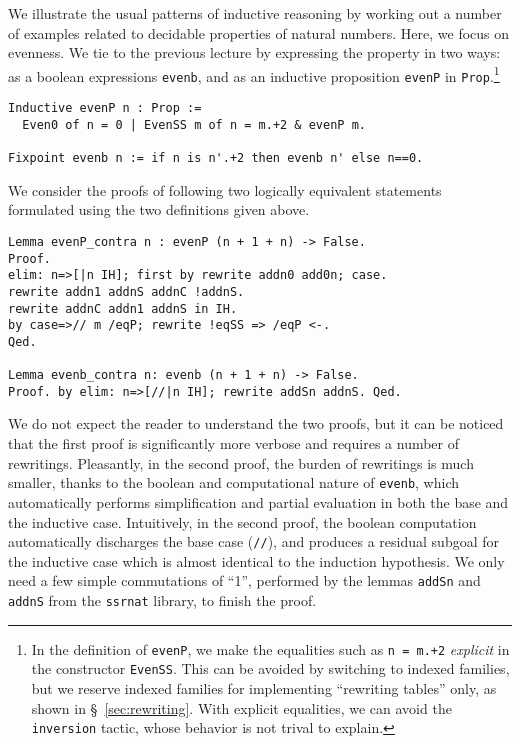 \documentclass[blockstyle,preprint,nocopyrightspace]{sigplanconf}
\newcommand{\is}[1]{\textcolor{blue}{(Ilya: {#1})}}
\newcommand{\an}[1]{\textcolor{red}{(Aleks: {#1})}}
\newcommand{\code}[1]{\lstinline{#1}}
\begin{document}
We illustrate the usual patterns of inductive reasoning by working out
a number of examples related to decidable properties of natural
numbers. Here, we focus on evenness. We tie to the previous lecture by
expressing the property in two ways: as a boolean expressions
\code{evenb}, and as an inductive proposition \code{evenP} in
\code{Prop}.\footnote{In the definition of \code{evenP}, we make the
  equalities such as \code{n = m.+2} \emph{explicit} in the
  constructor \code{EvenSS}. This can be avoided by switching to
  indexed families, but we reserve indexed families for implementing
  ``rewriting tables'' only, as shown in \S~\ref{sec:rewriting}.
%
  With explicit equalities, we can avoid the \code{inversion} tactic,
  whose behavior is not trival to explain.}
%
\begin{lstlisting}
Inductive evenP n : Prop :=
  Even0 of n = 0 | EvenSS m of n = m.+2 & evenP m.

Fixpoint evenb n := if n is n'.+2 then evenb n' else n==0.
\end{lstlisting}
%
We consider the proofs of following two logically equivalent
statements formulated using the two definitions given above.
%
%
%
\begin{lstlisting}
Lemma evenP_contra n : evenP (n + 1 + n) -> False.
Proof.
elim: n=>[|n IH]; first by rewrite addn0 add0n; case.
rewrite addn1 addnS addnC !addnS. 
rewrite addnC addn1 addnS in IH.
by case=>// m /eqP; rewrite !eqSS => /eqP <-.
Qed.

Lemma evenb_contra n: evenb (n + 1 + n) -> False.
Proof. by elim: n=>[//|n IH]; rewrite addSn addnS. Qed.
\end{lstlisting}
%
We do not expect the reader to understand the two proofs, but it can
be noticed that the first proof is significantly more verbose and
requires a number of rewritings. Pleasantly, in the second proof, the
burden of rewritings is much smaller, thanks to the boolean and
computational nature of \code{evenb}, which automatically performs
simplification and partial evaluation in both the base and the
inductive case. Intuitively, in the second proof, the boolean
computation automatically discharges the base case (\code{//}), and
produces a residual subgoal for the inductive case which is almost
identical to the induction hypothesis. We only need a few simple
commutations of ``1'', performed by the lemmas \code{addSn} and
\code{addnS} from the \code{ssrnat} library, to finish the proof.
\end{document}
